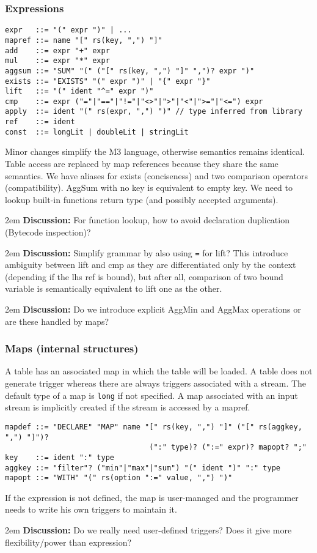 \documentclass[11pt]{article}
\def\discuss#1{\begingroup\par\leftskip2em {\footnotesize {\bf Discussion:} #1} \par\endgroup}
\begin{document}
\subsubsection*{Expressions}
\begin{verbatim}
expr   ::= "(" expr ")" | ...
mapref ::= name "[" rs(key, ",") "]"
add    ::= expr "+" expr
mul    ::= expr "*" expr
aggsum ::= "SUM" "(" ("[" rs(key, ",") "]" ",")? expr ")"
exists ::= "EXISTS" "(" expr ")" | "{" expr "}"
lift   ::= "(" ident "^=" expr ")"
cmp    ::= expr ("="|"=="|"!="|"<>"|">"|"<"|">="|"<=") expr
apply  ::= ident "(" rs(expr, ",") ")" // type inferred from library
ref    ::= ident
const  ::= longLit | doubleLit | stringLit
\end{verbatim}
Minor changes simplify the M3 language, otherwise semantics remains identical.
Table access are replaced by map references because they share the same semantics. 
We have aliases for exists (conciseness) and two comparison operators (compatibility).
AggSum with no key is equivalent to empty key.
We need to lookup built-in functions return type (and possibly accepted arguments).
\discuss{For function lookup, how to avoid declaration duplication (Bytecode inspection)?}
\discuss{Simplify grammar by also using {\tt =} for lift? This introduce ambiguity between lift and cmp as they are differentiated only by the context (depending if the lhs ref is bound), but after all, comparison of two bound variable is semantically equivalent to lift one as the other.}

\discuss{Do we introduce explicit AggMin and AggMax operations or are these handled by maps?}

\subsubsection*{Maps (internal structures)}
A table has an associated map in which the table will be loaded. A table does not generate trigger whereas there are always triggers associated with a stream. The default type of a map is {\tt long} if not specified. A map associated with an input stream is implicitly created if the stream is accessed by a mapref.
\begin{verbatim}
mapdef ::= "DECLARE" "MAP" name "[" rs(key, ",") "]" ("[" rs(aggkey, ",") "]")? 
                                 (":" type)? (":=" expr)? mapopt? ";" 
key    ::= ident ":" type
aggkey ::= "filter"? ("min"|"max"|"sum") "(" ident ")" ":" type
mapopt ::= "WITH" "(" rs(option ":=" value, ",") ")"
\end{verbatim}
If the expression is not defined, the map is user-managed and the programmer needs to write his own triggers to maintain it.
\discuss{Do we really need user-defined triggers? Does it give more flexibility/power than expression?}
\end{document}
